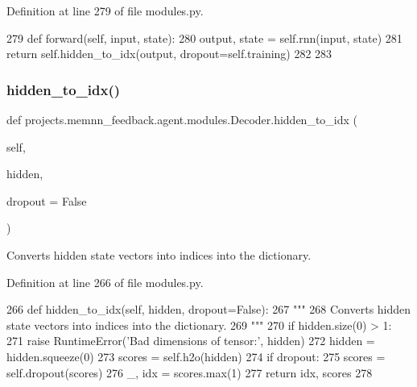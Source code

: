 Definition at line 279 of file modules.\+py.


\begin{DoxyCode}
279     \textcolor{keyword}{def }forward(self, input, state):
280         output, state = self.rnn(input, state)
281         \textcolor{keywordflow}{return} self.hidden\_to\_idx(output, dropout=self.training)
282 
283 
\end{DoxyCode}
\mbox{\label{classprojects_1_1memnn__feedback_1_1agent_1_1modules_1_1Decoder_a3f1f3b7a66bff23cd1923ff739c42456}} 
\subsubsection{\texorpdfstring{hidden\+\_\+to\+\_\+idx()}{hidden\_to\_idx()}}
{\footnotesize\ttfamily def projects.\+memnn\+\_\+feedback.\+agent.\+modules.\+Decoder.\+hidden\+\_\+to\+\_\+idx (\begin{DoxyParamCaption}\item[{}]{self,  }\item[{}]{hidden,  }\item[{}]{dropout = {\ttfamily False} }\end{DoxyParamCaption})}

\begin{DoxyVerb}Converts hidden state vectors into indices into the dictionary.
\end{DoxyVerb}
 

Definition at line 266 of file modules.\+py.


\begin{DoxyCode}
266     \textcolor{keyword}{def }hidden\_to\_idx(self, hidden, dropout=False):
267         \textcolor{stringliteral}{"""}
268 \textcolor{stringliteral}{        Converts hidden state vectors into indices into the dictionary.}
269 \textcolor{stringliteral}{        """}
270         \textcolor{keywordflow}{if} hidden.size(0) > 1:
271             \textcolor{keywordflow}{raise} RuntimeError(\textcolor{stringliteral}{'Bad dimensions of tensor:'}, hidden)
272         hidden = hidden.squeeze(0)
273         scores = self.h2o(hidden)
274         \textcolor{keywordflow}{if} dropout:
275             scores = self.dropout(scores)
276         \_, idx = scores.max(1)
277         \textcolor{keywordflow}{return} idx, scores
278 
\end{DoxyCode}


